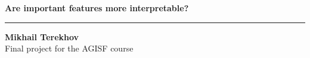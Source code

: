 \documentclass[12pt]{article}
\begin{document}
\begin{center}
  {\LARGE \bf{Are important features more interpretable?}}
\end{center}
\vspace{-1em}

\noindent\rule{\textwidth}{1pt}

  
\begin{center}
  {\large \bf{Mikhail Terekhov}} \\
  Final project for the AGISF course
\end{center}

\end{document}
